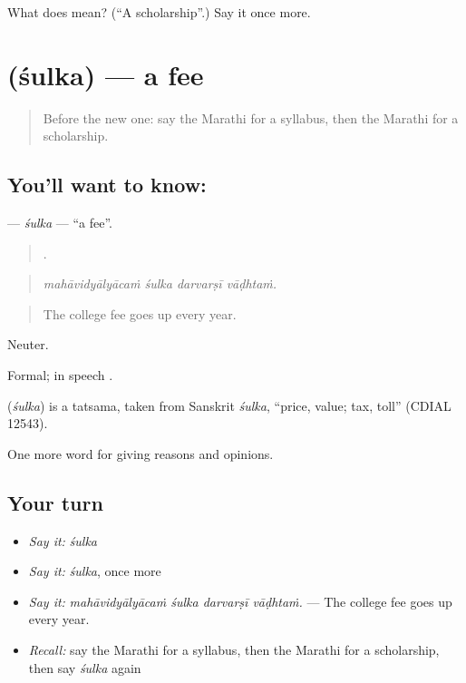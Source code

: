 \begin{tcolorbox}[breakable,colback=teal!4,colframe=teal!35!black,title={Before you move on}]
What does  mean? (\textquotedblleft{}A scholarship\textquotedblright{}.) Say it once more.
\end{tcolorbox}
\section[\texorpdfstring{\mr{शुल्क} (śulka)}{शुल्क (śulka)}]{ (śulka) — a fee}

\label{lesson:MR-C369-sulka}



\begin{quote}
Before the new one: say the Marathi for a syllabus, then the Marathi for a scholarship.
\end{quote}

\subsection*{You'll want to know: }
\textbf{} — \emph{śulka} — \textquotedblleft{}a fee\textquotedblright{}.

\begin{quote}
   .
\end{quote}

\begin{quote}
\emph{mahāvidyālyācaṁ śulka darvarṣī vāḍhtaṁ.}
\end{quote}

\begin{quote}
The college fee goes up every year.
\end{quote}

Neuter.

Formal; in speech .

\begin{cousinweb}
\textbf{} (\emph{śulka}) is a tatsama, taken from Sanskrit \emph{śulka}, \textquotedblleft{}price, value; tax, toll\textquotedblright{} (CDIAL 12543).
\end{cousinweb}

\begin{grammarlens}[title={What you've built}]
One more word for giving reasons and opinions.
\end{grammarlens}

\subsection*{Your turn}
\begin{itemize}
\raggedright
  \item \emph{Say it:} \emph{śulka}
  \item \emph{Say it:} \emph{śulka}, once more
  \item \emph{Say it:} \emph{mahāvidyālyācaṁ śulka darvarṣī vāḍhtaṁ.} — The college fee goes up every year.
  \item \emph{Recall:} say the Marathi for a syllabus, then the Marathi for a scholarship, then say \emph{śulka} again
\end{itemize}

